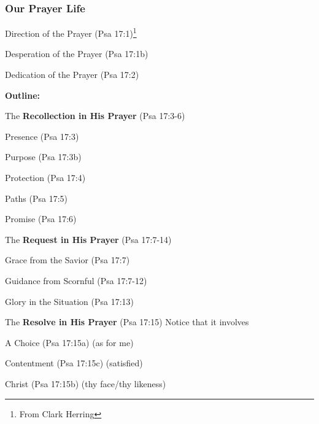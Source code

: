 \subsubsection{Our Prayer Life}

\begin{compactenum}[I.]
    \item Direction of the Prayer  (Psa 17:1)\footnote{From Clark Herring}
    \item Desperation of the Prayer  (Psa 17:1b) 
    \item Dedication of the Prayer  (Psa 17:2) 
\end{compactenum}
\textbf{Outline:}
\begin{compactenum}[I.]
    \item The \textbf{Recollection in His Prayer} (Psa 17:3-6)
	\begin{compactenum}[1.]
    		\item Presence (Psa 17:3) 
    		\item Purpose (Psa 17:3b) 
    		\item Protection (Psa 17:4) 
    		\item Paths (Psa 17:5) 
    		\item Promise (Psa 17:6) 
    	\end{compactenum}
    \item The \textbf{Request in His Prayer} (Psa 17:7-14)
	\begin{compactenum}[1.]
    		\item Grace from the Savior (Psa 17:7) 
    		\item Guidance from Scornful (Psa 17:7-12) 
    		\item Glory in the Situation (Psa 17:13) 
    	\end{compactenum}
    \item The \textbf{Resolve in His Prayer} (Psa 17:15) Notice that it involves
	\begin{compactenum}[1.]
    		\item A Choice (Psa 17:15a) (as for me) 
    		\item Contentment (Psa 17:15c) (satisfied) 
    		\item Christ (Psa 17:15b) (thy face/thy likeness)
	\end{compactenum}
    
\end{compactenum}



